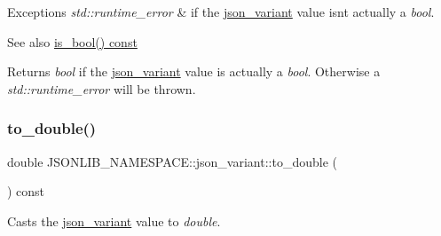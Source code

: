\begin{DoxyExceptions}{Exceptions}
{\em std\+::runtime\+\_\+error} & if the \hyperlink{classJSONLIB__NAMESPACE_1_1json__variant}{json\+\_\+variant} value isn\textquotesingle{}t actually a {\itshape bool}. \\
\hline
\end{DoxyExceptions}
\begin{DoxySeeAlso}{See also}
\hyperlink{classJSONLIB__NAMESPACE_1_1json__variant_a99bd3f5d21800b7b1cc7af956c17d534}{is\+\_\+bool() const} 
\end{DoxySeeAlso}
\begin{DoxyReturn}{Returns}
{\itshape bool} if the \hyperlink{classJSONLIB__NAMESPACE_1_1json__variant}{json\+\_\+variant} value is actually a {\itshape bool}. Otherwise a {\itshape std\+::runtime\+\_\+error} will be thrown. 
\end{DoxyReturn}
\mbox{\label{classJSONLIB__NAMESPACE_1_1json__variant_a9a5c7a9568e052b4a38d1b6107038d7b}} 
\subsubsection{\texorpdfstring{to\+\_\+double()}{to\_double()}}
{\footnotesize\ttfamily double J\+S\+O\+N\+L\+I\+B\+\_\+\+N\+A\+M\+E\+S\+P\+A\+C\+E\+::json\+\_\+variant\+::to\+\_\+double (\begin{DoxyParamCaption}{ }\end{DoxyParamCaption}) const}



Casts the \hyperlink{classJSONLIB__NAMESPACE_1_1json__variant}{json\+\_\+variant} value to {\itshape double}. 


